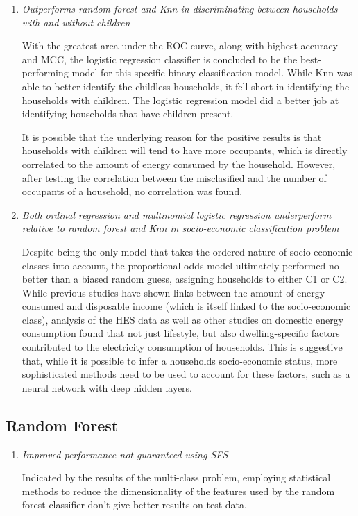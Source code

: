 \begin{enumerate}
\item \textit{Outperforms random forest and Knn in discriminating between households with and without children}

With the greatest area under the ROC curve, along with highest accuracy and MCC, the logistic regression classifier is concluded to be the best-performing model for this specific binary classification model. While Knn was able to better identify the childless households, it fell short in identifying the households with children.  The logistic regression model did a better job at identifying households that have children present. 

It is possible that the underlying reason for the positive results is that households with children will tend to have more occupants, which is directly correlated to the amount of energy consumed by the household. However, after testing the correlation between the misclasified and the number of occupants of a household, no correlation was found.


\item \textit{Both ordinal regression and multinomial logistic regression underperform relative to random forest and Knn in socio-economic classification problem}

Despite being the only model that takes the ordered nature of socio-economic classes into account, the proportional odds model ultimately performed no better than a biased random guess, assigning households to either C1 or C2. While previous studies have shown links between the amount of energy consumed and disposable income (which is itself linked to the socio-economic class), analysis of the HES data as well as other studies on domestic energy consumption found that not just lifestyle, but also dwelling-specific factors contributed to the electricity consumption of households. This is suggestive that, while it is possible to infer a households socio-economic status, more sophisticated methods need to be used to account for these factors, such as a neural network with deep hidden layers.
\end{enumerate}

\subsection{Random Forest}

\begin{enumerate}

\item \textit{Improved performance not guaranteed using SFS}

Indicated by the results of the multi-class problem, employing statistical methods to reduce the dimensionality of the features used by the random forest classifier don't give better results on test data. 

\end{enumerate}

